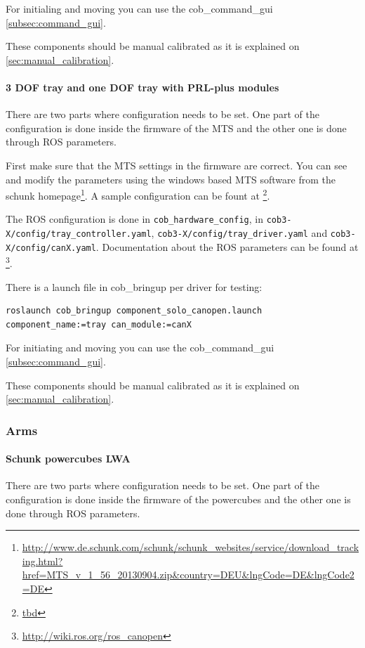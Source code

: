 For initialing and moving you can use the cob\_command\_gui \ref{subsec:command_gui}.

These components should be manual calibrated as it is explained on \ref{sec:manual_calibration}.

\paragraph{3 DOF tray and one DOF tray with PRL-plus modules}

There are two parts where configuration needs to be set. One part of the configuration is done inside the firmware of the MTS and the other one is done through ROS parameters.

First make sure that the MTS settings in the firmware are correct. You can see and modify the parameters using the windows based MTS software from the schunk homepage\footnote{\url{http://www.de.schunk.com/schunk/schunk_websites/service/download_tracking.html?href=MTS_v_1_56_20130904.zip&country=DEU&lngCode=DE&lngCode2=DE}}. A sample configuration can be fount at \footnote{\url{tbd}}.

The ROS configuration is done in \texttt{cob\_hardware\_config}, in \texttt{cob3-X/config/tray\_controller.yaml}, \texttt{cob3-X/config/tray\_driver.yaml} and \texttt{cob3-X/config/canX.yaml}. Documentation about the ROS parameters can be found at \footnote{\url{http://wiki.ros.org/ros_canopen}}.


There is a launch file in cob\_bringup per driver for testing:

\begin{lstlisting}
roslaunch cob_bringup component_solo_canopen.launch component_name:=tray can_module:=canX
\end{lstlisting}

For initiating and moving you can use the cob\_command\_gui \ref{subsec:command_gui}.

These components should be manual calibrated as it is explained on \ref{sec:manual_calibration}.

\subsubsection{Arms}


\paragraph{Schunk powercubes LWA}
There are two parts where configuration needs to be set. One part of the configuration is done inside the firmware of the powercubes and the other one is done through ROS parameters.

